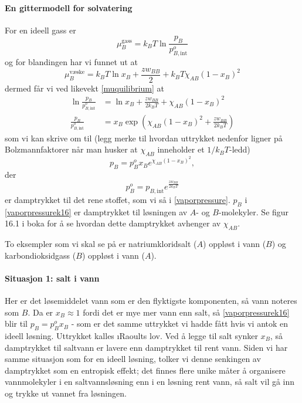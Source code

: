 \paragraph{En gittermodell for solvatering} For en ideell gass er 
\begin{equation}
	\mu_B^{\text{gass}}=k_BT\ln\frac{p_B}{p_{B,\text{int}}^o}
\end{equation}
og for blandingen har vi funnet ut at
\begin{equation}
	\mu_B^{\text{væske}}=k_BT\ln x_B+\frac{zw_{BB}}{2}+k_BT\chi_{AB}(1-x_B)^2
\end{equation}
dermed får vi ved likevekt \eqref{muquilibrium} at
\begin{align}
	\ln\frac{p_B}{p_{B,\text{int}}^o}&=\ln x_B +\frac{zw_{BB}}{2k_BT}+\chi_{AB}(1-x_B)^2 \\
	\frac{p_B}{p_{B,\text{int}}^o}&=x_B \exp\left(\chi_{AB}(1-x_B)^2+\frac{zw_{BB}}{2k_BT}\right)
\end{align}
som vi kan skrive om til (legg merke til hvordan uttrykket nedenfor ligner på Bolzmannfaktorer når man husker at $\chi_{AB}$ inneholder et $1/k_BT$-ledd)
\begin{equation}
	\label{vaporpressurek16}
	p_B=p_B^ox_Be^{\chi_{AB}(1-x_B)^2},
\end{equation}
der
\begin{equation}
	p_B^o = p_{B,\text{int}}e^{\frac{zw_{BB}}{2k_BT}}
\end{equation}
er damptrykket til det rene stoffet, som vi så i \eqref{vaporpressure}. $p_B$ i \eqref{vaporpressurek16} er damptrykket til løsningen av $A$- og $B$-molekyler. Se figur 16.1 i boka for å se hvordan dette damptrykket avhenger av $\chi_{AB}$.

To eksempler som vi skal se på er natriumkloridsalt ($A$) oppløst i vann ($B$) og karbondioksidgass ($B$) oppløst i vann ($A$).

\paragraph{Situasjon 1: salt i vann} Her er det løsemiddelet vann som er den flyktigste komponenten, så vann noteres som $B$. Da er $x_B\approx 1$ fordi det er mye mer vann enn salt, så \eqref{vaporpressurek16} blir til $p_B=p_B^ox_B$ - som er det samme uttrykket vi hadde fått hvis vi antok en ideell løsning. Uttrykket kalles \i{Raoults lov}. Ved å legge til salt synker $x_B$, så damptrykket til saltvann er lavere enn damptrykket til rent vann. Siden vi har samme situasjon som for en ideell løsning, tolker vi denne senkingen av damptrykket som en entropisk effekt; det finnes flere unike måter å organisere vannmolekyler i en saltvannsløsning enn i en løsning rent vann, så salt vil gå inn og trykke ut vannet fra løsningen.


